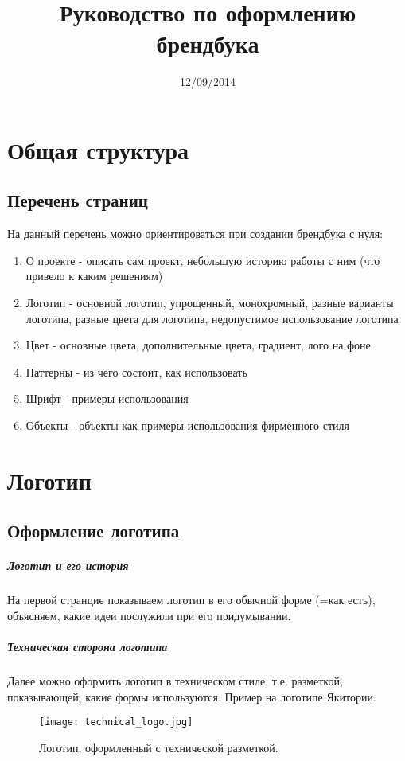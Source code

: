 \documentclass[DIV=calc, paper=a4, fontsize=11pt]{scrartcl} %
\title{Руководство по оформлению брендбука}
\date{12/09/2014}
\begin{document}
\maketitle


\chapter{Общая структура}

\section{Перечень страниц}
На данный перечень можно ориентироваться при создании брендбука с нуля:

    \begin{enumerate}
        \item О проекте - описать сам проект, небольшую историю работы с ним (что привело к каким решениям) 
        \item Логотип - основной логотип, упрощенный, монохромный, разные варианты логотипа, разные цвета для логотипа, недопустимое использование логотипа
        \item Цвет - основные цвета, дополнительные цвета, градиент, лого на фоне
        \item Паттерны - из чего состоит, как использовать
        \item Шрифт - примеры использования
        \item Объекты - объекты как примеры использования фирменного стиля
    \end{enumerate}



\chapter{Логотип}

\section{Оформление логотипа}

\paragraph{Логотип и его история} На первой странцие показываем логотип в его обычной форме (=как есть), объясняем, какие идеи послужили при его придумывании.
\paragraph{Техническая сторона логотипа}
Далее можно оформить логотип в техническом стиле, т.е. разметкой, показывающей, какие формы используются. Пример на логотипе Якитории:
        \begin{figure}[H]
        \centering
        \texttt{[image: technical\_logo.jpg]}
        \caption{Логотип, оформленный с технической разметкой. \label{technical_logo.jpg}}
        \end{figure}
        
\end{document}
